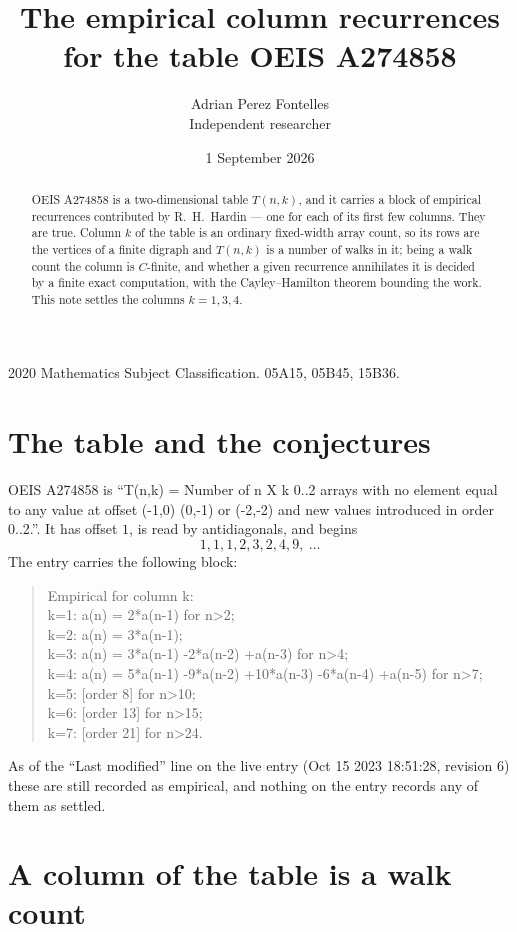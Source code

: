 \documentclass[11pt,a4paper]{article}
\title{The empirical column recurrences for the table OEIS A274858}
\author{Adrian Perez Fontelles\\ \small Independent researcher}
\date{1 September 2026}
\theoremstyle{plain}
\theoremstyle{definition}
\begin{document}
\maketitle

\begin{abstract}
OEIS A274858 is a two-dimensional table $T(n,k)$, and it carries a block of empirical
recurrences contributed by R.~H.~Hardin --- one for each of its first few columns. They are
true. Column $k$ of the table is an ordinary fixed-width array count, so its rows are the
vertices of a finite digraph and $T(n,k)$ is a number of walks in it; being a walk count the
column is $C$-finite, and whether a given recurrence annihilates it is decided by a finite
exact computation, with the Cayley--Hamilton theorem bounding the work. This note settles the columns $k=1, 3, 4$.
\end{abstract}

\noindent\small 2020 Mathematics Subject Classification. 05A15, 05B45, 15B36.\normalsize

\section{The table and the conjectures}

OEIS A274858 is ``T(n,k) = Number of n X k 0..2 arrays with no element equal to any value at offset (-1,0) (0,-1) or (-2,-2) and new values introduced in order 0..2.''. It has offset $1$, is
read by antidiagonals, and begins
\[
1, 1, 1, 2, 3, 2, 4, 9,\ \dots
\]
The entry carries the following block:
\begin{quote}\small
Empirical for column k:\\
k=1: a(n) = 2*a(n-1) for n>2;\\
k=2: a(n) = 3*a(n-1);\\
k=3: a(n) = 3*a(n-1) -2*a(n-2) +a(n-3) for n>4;\\
k=4: a(n) = 5*a(n-1) -9*a(n-2) +10*a(n-3) -6*a(n-4) +a(n-5) for n>7;\\
k=5: [order 8] for n>10;\\
k=6: [order 13] for n>15;\\
k=7: [order 21] for n>24.\\
\end{quote}
As of the ``Last modified'' line on the live entry (Oct 15 2023 18:51:28, revision 6) these are still
recorded as empirical, and nothing on the entry records any of them as settled.

\section{A column of the table is a walk count}
\end{document}
